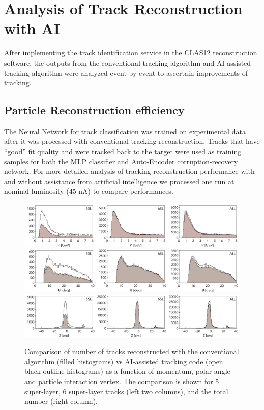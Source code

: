 \section{Analysis of Track Reconstruction with AI}

After implementing the track identification service in the CLAS12 reconstruction software, the outputs
from the conventional tracking algorithm and AI-assisted tracking algorithm were analyzed
event by event to ascertain improvements of tracking. 
 
 \subsection{Particle Reconstruction efficiency}
 
 The Neural Network for track classification was trained on experimental data after it was processed with conventional tracking 
 reconstruction. Tracks that have ``good'' fit quality and were tracked back to the target were used as training samples for both 
 the MLP classifier and Auto-Encoder corruption-recovery network. For more detailed analysis of tracking reconstruction performance with and without assistance from artificial intelligence we processed one run at nominal luminosity (45 nA) to compare performances.
 
 \begin{figure}[!ht]
\begin{center}
  \includegraphics[width=6.5in]{images/figure_p.pdf}
  \includegraphics[width=6.5in]{images/figure_theta.pdf}
    \includegraphics[width=6.5in]{images/figure_vz.pdf}
\caption { Comparison of number of tracks reconstructed with the conventional algorithm (filled histograms) vs AI-assisted tracking code (open black outline histograms) as a function of momentum, polar angle and particle interaction vertex. The comparison is shown for 5 super-layer, 6 super-layer tracks (left two columns), and the total number (right column).}
 \label{track:efficiency}
 \end{center}
\end{figure}

